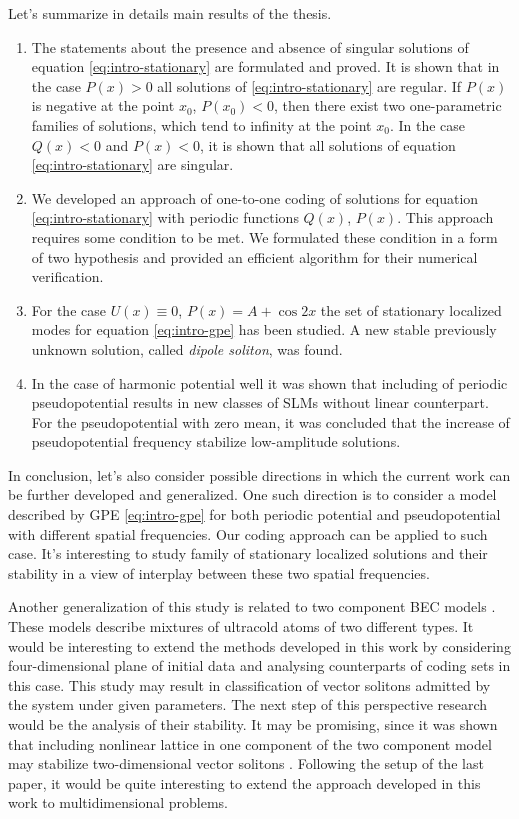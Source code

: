Let's summarize in details main results of the thesis.
\begin{enumerate}
	\item The statements about the presence and absence of singular solutions of equation \eqref{eq:intro-stationary} are formulated and proved.
		It is shown that in the case $P(x) > 0$ all solutions of \eqref{eq:intro-stationary} are regular.
		If $P(x)$ is negative at the point $x_0$, $P(x_0) < 0$, then there exist two one-parametric families of solutions, which tend to infinity at the point $x_0$.
		In the case $Q(x) < 0$ and $P(x) < 0$, it is shown that all solutions of equation \eqref{eq:intro-stationary} are singular.
	\item We developed an approach of one-to-one coding of solutions for equation \eqref{eq:intro-stationary} with periodic functions $Q(x)$, $P(x)$.
		This approach requires some condition to be met.
		We formulated these condition in a form of two hypothesis and provided an efficient algorithm for their numerical verification.
	\item For the case $U(x) \equiv 0$, $P(x) = A + \cos 2x$ the set of stationary localized modes for equation \eqref{eq:intro-gpe} has been studied.
		A new stable previously unknown solution, called {\it dipole soliton}, was found.
	\item In the case of harmonic potential well it was shown that including of periodic pseudopotential results in new classes of SLMs without linear counterpart.
		For the pseudopotential with zero mean, it was concluded that the increase of pseudopotential frequency stabilize low-amplitude solutions.
\end{enumerate}

In conclusion, let's also consider possible directions in which the current work can be further developed and generalized.
One such direction is to consider a model described by GPE \eqref{eq:intro-gpe} for both periodic potential and pseudopotential with different spatial frequencies.
Our coding approach can be applied to such case.
It's interesting to study family of stationary localized solutions and their stability in a view of interplay between these two spatial frequencies.

Another generalization of this study is related to two component BEC models \cite{TrippenbachGoralRzazewskiMalomedBand, OhbergSantos, SvidzinskyChui, NavarroCarreteroGonzalezKevrekidis, KevrekidisFrantzeskakis2016}.
These models describe mixtures of ultracold atoms of two different types.
It would be interesting to extend the methods developed in this work by considering four-dimensional plane of initial data and analysing counterparts of coding sets in this case. 
This study may result in classification of vector solitons admitted by the system under given parameters.
The next step of this perspective research would be the analysis of their stability.
It may be promising, since it was shown that including nonlinear lattice in one component of the two component model may stabilize two-dimensional vector solitons \cite{BorovkovaMalomedKartashov}.
Following the setup of the last paper, it would be quite interesting to extend the approach developed in this work to multidimensional problems.
